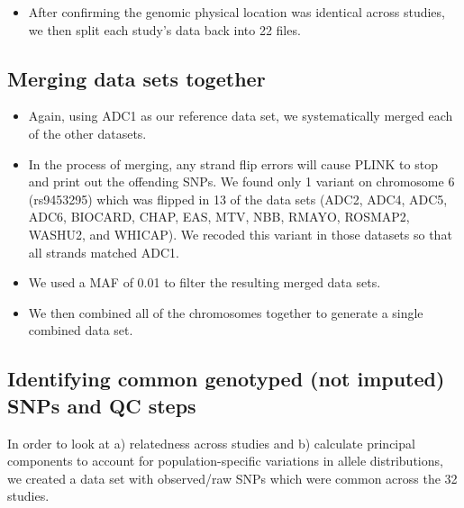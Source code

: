\documentclass[12pt]{article}
\begin{document}
\begin{itemize}
\item After confirming the genomic physical location was identical across studies, we then split each study’s data back into 22 files.

\end{itemize}

\subsection{Merging data sets together}
\begin{itemize}

\item Again, using ADC1 as our reference data set, we systematically merged each of the other datasets.

\item In the process of merging, any strand flip errors will cause PLINK to stop and print out the offending SNPs. We found only 1 variant on chromosome 6 (rs9453295) which was flipped in 13 of the data sets (ADC2, ADC4, ADC5, ADC6, BIOCARD, CHAP, EAS, MTV, NBB, RMAYO, ROSMAP2, WASHU2, and WHICAP). We recoded this variant in those datasets so that all strands matched ADC1.

\item We used a MAF of 0.01 to filter the resulting merged data sets.

\item We then combined all of the chromosomes together to generate a single combined data set.

\end{itemize}


\subsection{Identifying common genotyped (not imputed) SNPs and QC steps}

In order to look at a) relatedness across studies and b) calculate principal components to account for population-specific variations in allele distributions, we created a data set with observed/raw SNPs which were common across the 32 studies.
\end{document}
